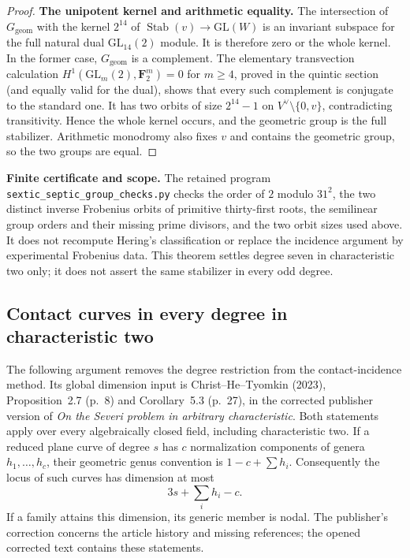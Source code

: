 \begin{proof}
\par\smallskip\noindent\textbf{The unipotent kernel and arithmetic equality.}
The intersection of $G_{\mathrm{geom}}$ with the kernel
$2^{14}$ of $\operatorname{Stab}(v)\to\mathrm{GL}(W)$ is an invariant
subspace for the full natural dual $\mathrm{GL}_{14}(2)$ module.
It is therefore zero or the whole kernel.  In the former case,
$G_{\mathrm{geom}}$ is a complement.  The elementary transvection
calculation $H^1(\mathrm{GL}_m(2),\mathbf F_2^m)=0$ for $m\ge4$,
proved in the quintic section (and equally valid for the dual),
shows that every such complement is conjugate to the standard one.
It has two orbits of size $2^{14}-1$ on
$V^\vee\setminus\{0,v\}$, contradicting transitivity.
Hence the whole kernel occurs, and the geometric group is the
full stabilizer.  Arithmetic monodromy also fixes $v$ and contains
the geometric group, so the two groups are equal.
\end{proof}

\par\smallskip\noindent\textbf{Finite certificate and scope.}
The retained program \texttt{sextic\_septic\_group\_checks.py}
checks the order of $2$ modulo $31^2$, the two distinct inverse
Frobenius orbits of primitive thirty-first roots, the semilinear
group orders and their missing prime divisors, and the two orbit
sizes used above.  It does not recompute Hering's classification
or replace the incidence argument by experimental Frobenius data.
This theorem settles degree seven in characteristic two only;
it does not assert the same stabilizer in every odd degree.

\subsection{Contact curves in every degree in characteristic two}
\label{subsec:all-degree-char2-contact}

The following argument removes the degree restriction from the
contact-incidence method.  Its global dimension input is
Christ--He--Tyomkin (2023), Proposition~2.7 (p.~8) and
Corollary~5.3 (p.~27), in the corrected publisher version of
\emph{On the Severi problem in arbitrary characteristic}.
Both statements apply over every algebraically closed field,
including characteristic two.  If a reduced plane curve of degree
$s$ has $c$ normalization components of genera $h_1,\ldots,h_c$,
their geometric genus convention is $1-c+\sum h_i$.  Consequently
the locus of such curves has dimension at most
\begin{equation}\label{eq:contact-severi-bound}
 3s+\sum_i h_i-c.
\end{equation}
If a family attains this dimension, its generic member is nodal.
The publisher's correction concerns the article history and missing
references; the opened corrected text contains these statements.

